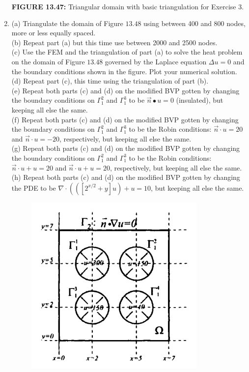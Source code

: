\documentclass[../main.tex]{subfiles}
\begin{document}
\begin{enumerate}
\begin{figure}[H]
	\centering
	\label{pfig:ch13_34}
\end{figure}
\textbf{FIGURE 13.47:} Triangular domain  with basic triangulation for Exercise 3. 
	\item 
	(a) Triangulate the domain of Figure $13.48$ using between 400 and 800 nodes, more or less equally spaced.\\
(b) Repeat part (a) but this time use between 2000 and 2500 nodes.\\
(c) Use the FEM and the triangulation of part
(a) to solve the heat problem on the domain of Figure $13.48$ governed by the Laplace equation $\Delta u=0$ and the boundary conditions shown in the figure. Plot your numerical solution.\\
(d) Repeat part (c), this time using the triangulation of part (b).\\
(e) Repeat both parts (c) and (d) on the modified BVP gotten by changing the boundary conditions on $\Gamma_{1}^{2}$ and $\Gamma_{1}^{3}$ to be $\vec{n} \bullet u=0$ (insulated), but keeping all else the same.\\
(f) Repeat both parts (c) and (d) on the modified BVP gotten by changing the boundary conditions on $\Gamma_{1}^{2}$ and $\Gamma_{1}^{3}$ to be the Robin conditions: $\vec{n} \cdot u=20$ and $\vec{n} \cdot u=-20$, respectively, but keeping all else the same.\\
(g) Repeat both parts (c) and (d) on the modified BVP gotten by changing the boundary conditions on $\Gamma_{1}^{2}$ and $\Gamma_{1}^{3}$ to be the Robin conditions: $\vec{n} \cdot u+u=20$ and $\vec{n} \cdot u+u=20$, respectively, but keeping all else the same.\\
(h) Repeat both parts (c) and (d) on the modified BVP gotten by changing the PDE to be $\nabla \cdot\left(\left(\left[2^{x / 2}+y\right] u\right)+u=10\right.$, but keeping all else the same.
\begin{figure}[H]
\includegraphics[width=0.5\linewidth]{35}

\end{figure}
\end{enumerate}
\end{document}
